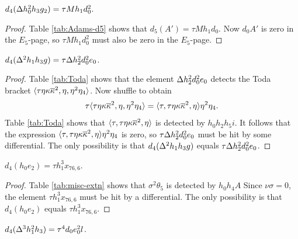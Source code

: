 \begin{lemma}
\label{lem:d4-Dh0^2h3g2}
$d_4(\Delta h_0^2 h_3 g_2) = \tau M h_1 d_0^2$.
\end{lemma}

\begin{proof}
Table \ref{tab:Adams-d5} shows that 
$d_5(A') = \tau M h_1 d_0$.
Now $d_0 A'$ is zero in the $E_5$-page, so
$\tau M h_1 d_0^2$ must also be zero in the $E_5$-page.
\end{proof}

\begin{lemma}
\label{lem:d4-D^2h1h3g}
$d_4(\Delta^2 h_1 h_3 g) = \tau \Delta h_2^2 d_0^2 e_0$.
\end{lemma}

\begin{proof}
Table \ref{tab:Toda} shows that the element
$\Delta h_2^2 d_0^2 e_0$ detects the Toda bracket
$\langle \tau \eta \kappa \overline{\kappa}^2, \eta, \eta^2 \eta_4 \rangle$.
Now shuffle to obtain
\[
\tau \langle \tau \eta \kappa \overline{\kappa}^2, \eta, \eta^2 \eta_4 \rangle =
\langle \tau, \tau \eta \kappa \overline{\kappa}^2, \eta \rangle \eta^2 \eta_4.
\]
Table \ref{tab:Toda} shows that
$\langle \tau, \tau \eta \kappa \overline{\kappa}^2, \eta \rangle$ is detected
by $h_0 h_2 h_5 i$.
It follows that the expression
$\langle \tau, \tau \eta \kappa \overline{\kappa}^2, \eta \rangle \eta^2 \eta_4$
is zero, so $\tau \Delta h_2^2 d_0^2 e_0$ must be hit by some differential.
The only possibility is that 
$d_4(\Delta^2 h_1 h_3 g)$ equals 
$\tau \Delta h_2^2 d_0^2 e_0$.
\end{proof}

\begin{lemma}
\label{lem:d4-h0e2}
$d_4(h_0 e_2) = \tau h_1^3 x_{76,6}$.
\end{lemma}

\begin{proof}
Table \ref{tab:misc-extn}
shows that $\sigma^2 \theta_5$ is detected by
$h_0 h_4 A$ 
Since $\nu \sigma = 0$, the element
$\tau h_1^3 x_{76,6}$ must be hit
by a differential.
The only possibility is that $d_4(h_0 e_2)$ equals
$\tau h_1^3 x_{76,6}$.
\end{proof}

\begin{lemma}
\label{lem:d4-D^3h1^2h3}
$d_4(\Delta^3 h_1^2 h_3) = \tau^4 d_0 e_0^2 l$.
\end{lemma}

